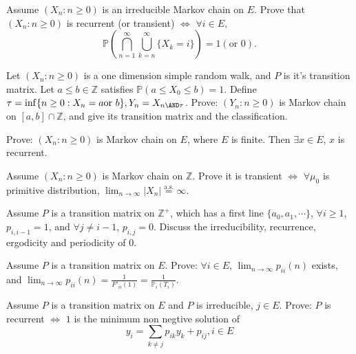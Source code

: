 \documentclass{ctexart}
\newif\ifpreface
\begin{document}
\large
\setlength{\baselineskip}{1.2em}
\ifpreface
  
\else
\fi
{}
\begin{problem}\label{pro:1}
  Assume \((X_n:n \geq 0)\) is an irreducible Markov chain on \(E\).
  Prove that \((X_n:n \geq 0)\) is recurrent (or transient) \(\iff\)
  \(\forall i \in E\),
  \[
    \mathbb{P}\left(\bigcap_{n=1}^{\infty} \bigcup_{k=n}^{\infty} \{X_k=i\}\right)=1 (\text{or } 0).
  \]
\end{problem}
\begin{problem}\label{pro:2}
  Let \((X_n:n \geq 0)\) is a one dimension simple random walk, and \(P\) is it's transition matrix.
  Let \(a \leq b \in \mathbb{Z}\) satisfies \(\mathbb{P}(a \leq X_0 \leq b)=1\).
  Define \(\tau = \inf \{n \geq 0: X_n =a \text{or } b\}, Y_n=X_{n \AND \tau}\).
  Prove: \((Y_n: n \geq 0)\) is Markov chain on \([a,b]\cap \mathbb{Z}\), and give its transition matrix and
  the classification.
\end{problem}
\begin{problem}\label{pro:3}
  Prove: \((X_n: n \geq 0)\) is Markov chain on \(E\), where \(E\) is finite. Then \(\exists x \in E\), \(x\) is recurrent.
\end{problem}
\begin{problem}\label{pro:4}
  Assume \((X_n:n \geq 0)\) is Markov chain on \(\mathbb{Z}\). Prove it is transient \(\iff\)
  \(\forall \mu_0\) is primitive distribution, \(\lim_{n \to \infty} |X_n| \overset{\text{a.s.}}{=} \infty\).
\end{problem}
\begin{problem}\label{pro:5}
  Assume \(P\) is a transition matrix on \(\mathbb{Z}^+\), which has a first line \(\{a_0,a_1,\cdots\}\),
  \(\forall i \geq 1\), \(p_{i,i-1}=1\), and \(\forall j \neq i-1\), \(p_{i,j}=0\).
  Discuss the irreducibility, recurrence, ergodicity and periodicity of \(0\).
\end{problem}
\begin{problem}\label{pro:6}
  Assume \(P\) is a transition matrix on \(E\).
  Prove: \(\forall i \in E\), \(\lim_{n \to \infty}p_{ii}(n)\) exists, and \(\lim_{n \to \infty}p_{ii}(n)=\frac{1}{F'_{ii}(1)}=\frac{1}{\mathbb{P}_i(T_i)}\).
\end{problem}
\begin{problem}\label{pro:7}
  Assume \(P\) is a transition matrix on \(E\) and \(P\) is irreducible, \(j \in E\).
  Prove: \(P\) is recurrent \(\iff\) \(1\) is the minimum non negtive solution of
  \[
    y_i = \sum_{k \neq j} p_{ik}y_k + p_{ij}, i \in E
  \]
\end{problem}
\end{document}
